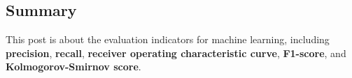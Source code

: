 \subsection{Summary}
This post is about the evaluation indicators for machine learning,
including \textbf{precision}, \textbf{recall}, 
\textbf{receiver operating characteristic curve},
\textbf{F1-score}, and \textbf{Kolmogorov-Smirnov score}.